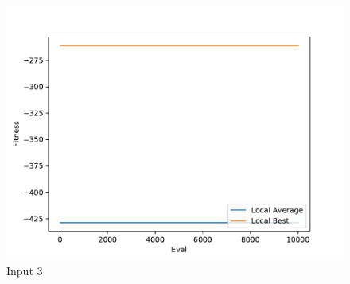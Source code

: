 \documentclass{standalone}
\begin{document}
\begin{figure}[!htb]
	\caption{Input 3}
	\label{fig:graph_3030}
	\includegraphics[width=\textwidth]{../graphs/graphs/3030.pdf}
\end{figure}
\end{document}
